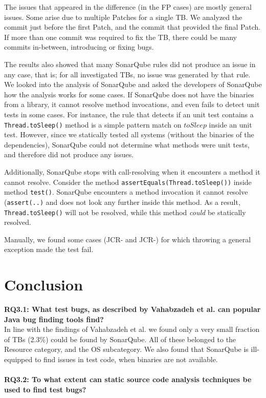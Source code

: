 \documentclass{uvamscse}
\newcommand{\Atestbugs}{Vahabzadeh et al.}
\begin{document}
The issues that appeared in the difference (in the FP cases) are mostly general issues. Some arise due to multiple Patches for a single TB. We analyzed the commit just before the first Patch, and the commit that provided the final Patch. If more than one commit was required to fix the TB, there could be many commits in-between, introducing or fixing bugs.

The results also showed that many SonarQube rules did not produce an issue in any case, that is; for all investigated TBs, no issue was generated by that rule. We looked into the analysis of SonarQube and asked the developers of SonarQube how the analysis works for some cases. If SonarQube does not have the binaries from a library, it cannot resolve method invocations, and even fails to detect unit tests in some cases. For instance, the rule that detects if an unit test contains a \texttt{Thread.toSleep()} method is a simple pattern match on $toSleep$ inside an unit test. However, since we statically tested all systems (without the binaries of the dependencies), SonarQube could not determine what methods were unit tests, and therefore did not produce any issues. 

Additionally, SonarQube stops with call-resolving when it encounters a method it cannot resolve. Consider the method \texttt{assertEquals(Thread.toSleep())} inside method \texttt{test()}. SonarQube encounters a method invocation it cannot resolve (\texttt{assert(..)} and does not look any further inside this method. As a result, \texttt{Thread.toSleep()} will not be resolved, while this method \emph{could} be statically resolved.  

Manually, we found some cases  (JCR- and JCR-) for which throwing a general exception made the test fail.

\section{Conclusion}
\textbf{RQ3.1: What test bugs, as described by \Atestbugs{} can popular Java bug finding tools find?}  \\ 

In line with the findings of \Atestbugs{} we found only a very small fraction of TBs (2.3\%) could be found by SonarQube. All of these belonged to the Resource category, and the OS subcategory. We also found that SonarQube is ill-equipped to find issues in test code, when binaries are not available. \\ \\
\textbf{RQ3.2: To what extent can static source code analysis techniques be used to find test bugs?} \\
\end{document}
